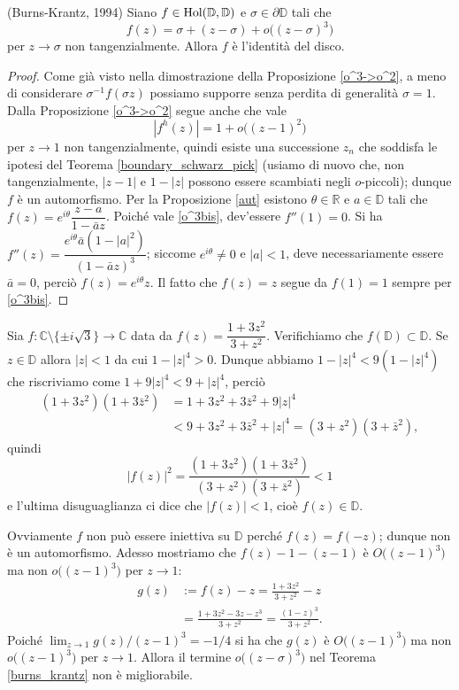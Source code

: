 \begin{thm} \label{burns_krantz}
  (Burns-Krantz, 1994) Siano $f \in \text{\normalfont{Hol}}(\mathbb{D},\mathbb{D})$ e $\sigma \in \partial\mathbb{D}$ tali che
  \begin{equation} \label{o^3bis}
    f(z)=\sigma+(z-\sigma)+o\bigl((z-\sigma)^3\bigr)
  \end{equation}
  per $z \longrightarrow \sigma$ non tangenzialmente. Allora $f$ è l'identità del disco.
\end{thm}

\begin{proof}
  Come già visto nella dimostrazione della Proposizione \ref{o^3->o^2}, a meno di considerare $\sigma^{-1}f(\sigma z)$ possiamo supporre senza perdita di generalità $\sigma=1$.
  Dalla Proposizione \ref{o^3->o^2} segue anche che vale
  $$|f^h(z)|=1+o\bigl((z-1)^2\bigr)$$
  per $z \longrightarrow 1$ non tangenzialmente, quindi esiste una successione $z_n$ che soddisfa le ipotesi del Teorema \ref{boundary_schwarz_pick} (usiamo di nuovo che, non tangenzialmente, $|z-1|$ e $1-|z|$ possono essere scambiati negli $o$-piccoli); dunque $f$ è un automorfismo.
  Per la Proposizione \ref{aut} esistono $\theta \in \mathbb{R}$ e $a \in \mathbb{D}$ tali che $f(z)=e^{i\theta}\dfrac{z-a}{1-\bar{a}z}$. Poiché vale \eqref{o^3bis}, dev'essere $f''(1)=0$. Si ha $f''(z)=\dfrac{e^{i\theta}\bar{a}(1-|a|^2)}{(1-\bar{a}z)^3}$;
  siccome $e^{i\theta}\not=0$ e $|a|<1$, deve necessariamente essere $\bar{a}=0$, perciò $f(z)=e^{i\theta}z$. Il fatto che $f(z)=z$ segue da $f(1)=1$ sempre per \eqref{o^3bis}.
\end{proof}

\begin{ex}
  Sia $f:\mathbb{C}\setminus\{\pm i\sqrt{3}\} \longrightarrow \mathbb{C}$ data da $f(z)=\dfrac{1+3z^2}{3+z^2}$. Verifichiamo che $f(\mathbb{D}) \subset \mathbb{D}$. Se $z \in \mathbb{D}$ allora $|z|<1$ da cui $1-|z|^4>0$.
  Dunque abbiamo $1-|z|^4 < 9(1-|z|^4)$ che riscriviamo come $1+9|z|^4 < 9+|z|^4$, perciò
  \begin{align*}
    (1+3z^2)(1+3\bar{z}^2) &=1+3z^2+3\bar{z}^2+9|z|^4 \\
    & < 9+3z^2+3\bar{z}^2+|z|^4=(3+z^2)(3+\bar{z}^2),
  \end{align*}
  quindi
  $$|f(z)|^2=\frac{(1+3z^2)(1+3\bar{z}^2)}{(3+z^2)(3+\bar{z}^2)} < 1$$
  e l'ultima disuguaglianza ci dice che $|f(z)|<1$, cioè $f(z) \in \mathbb{D}$.

  Ovviamente $f$ non può essere iniettiva su $\mathbb{D}$ perché $f(z)=f(-z)$; dunque non è un automorfismo. Adesso mostriamo che $f(z)-1-(z-1)$ è $O\bigl((z-1)^3\bigr)$ ma non $o\bigl((z-1)^3\bigr)$ per $z \longrightarrow 1$:
  \begin{align*}
    g(z) & := f(z)-z=\frac{1+3z^2}{3+z^2}-z \\
    & =\frac{1+3z^2-3z-z^3}{3+z^2}=\frac{(1-z)^3}{3+z^2}.
  \end{align*}
  Poiché $\displaystyle \lim_{z \longrightarrow 1} g(z)/(z-1)^3=-1/4$ si ha che $g(z)$ è $O\bigl((z-1)^3\bigr)$ ma non $o\bigl((z-1)^3\bigr)$ per $z \longrightarrow 1$. Allora il termine $o\bigl((z-\sigma)^3\bigr)$ nel Teorema \ref{burns_krantz} non è migliorabile.
\end{ex}

